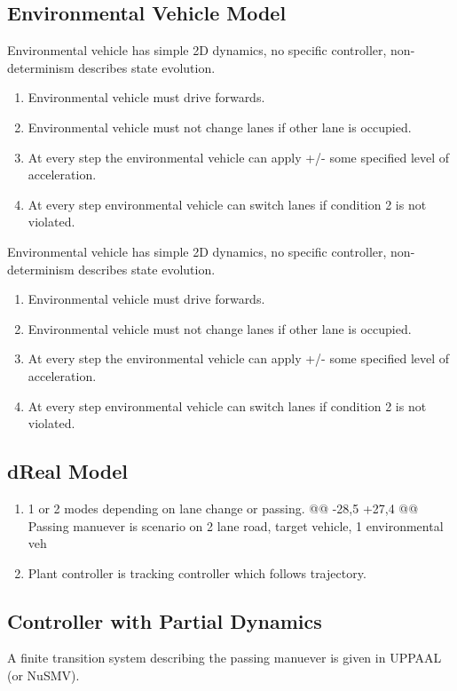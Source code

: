 \subsection{Environmental Vehicle Model}
Environmental vehicle has simple 2D dynamics, no specific controller, non-determinism describes state evolution.
\begin{enumerate}
	\item Environmental vehicle must drive forwards.
	\item Environmental vehicle must not change lanes if other lane is occupied.
	\item At every step the environmental vehicle can apply +/- some specified level of acceleration.
	\item At every step environmental vehicle can switch lanes if condition 2 is not violated.
\end{enumerate}
Environmental vehicle has simple 2D dynamics, no specific controller, non-determinism describes state evolution.
\begin{enumerate}
	\item Environmental vehicle must drive forwards.
	\item Environmental vehicle must not change lanes if other lane is occupied.
	\item At every step the environmental vehicle can apply +/- some specified level of acceleration.
	\item At every step environmental vehicle can switch lanes if condition 2 is not violated.
\end{enumerate}
\subsection{dReal Model}
\begin{enumerate}
	\item 1 or 2 modes depending on lane change or passing.
	@@ -28,5 +27,4 @@ Passing manuever is scenario on 2 lane road, target vehicle, 1 environmental veh
	\item Plant controller is tracking controller which follows trajectory.
\end{enumerate}
\subsection{Controller with Partial Dynamics}
A finite transition system describing the passing manuever is given in UPPAAL (or NuSMV).